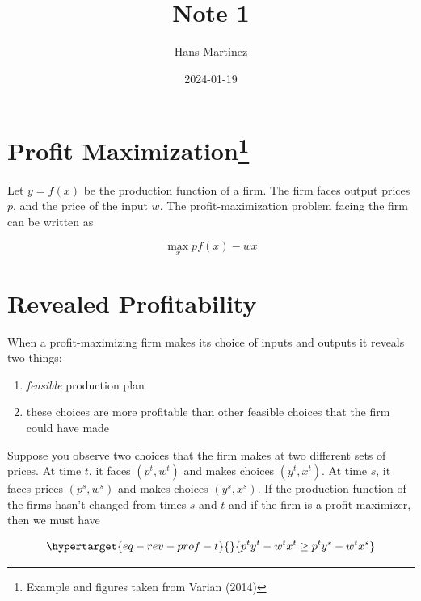 \documentclass[
]{article}
\title{Note 1}
\author{Hans Martinez}
\date{2024-01-19}
\providecommand{\tightlist}{%
  \setlength{\itemsep}{0pt}\setlength{\parskip}{0pt}}\usepackage{longtable,booktabs,array}
\begin{document}
\maketitle
\ifdefined\Shaded\renewenvironment{Shaded}{\begin{tcolorbox}[sharp corners, boxrule=0pt, borderline west={3pt}{0pt}{shadecolor}, enhanced, interior hidden, frame hidden, breakable]}{\end{tcolorbox}}\fi

\hypertarget{profit-maximizationsource}{%
\section[Profit Maximization]{\texorpdfstring{Profit
Maximization\footnote{Example and figures taken from Varian (2014)}}{Profit Maximization}}\label{profit-maximizationsource}}

Let \(y=f(x)\) be the production function of a firm. The firm faces
output prices \(p\), and the price of the input \(w\). The
profit-maximization problem facing the firm can be written as

\[
\max_x pf(x)-wx
\]

\hypertarget{revealed-profitability}{%
\section{Revealed Profitability}\label{revealed-profitability}}

When a profit-maximizing firm makes its choice of inputs and outputs it
reveals two things:

\begin{enumerate}
\def\labelenumi{\arabic{enumi}.}
\tightlist
\item
  \emph{feasible} production plan
\item
  these choices are more profitable than other feasible choices that the
  firm could have made
\end{enumerate}

Suppose you observe two choices that the firm makes at two different
sets of prices. At time \(t\), it faces \((p^t,w^t)\) and makes choices
\((y^t,x^t)\). At time \(s\), it faces prices \((p^s,w^s)\) and makes
choices \((y^s,x^s)\). If the production function of the firms hasn't
changed from times \(s\) and \(t\) and if the firm is a profit
maximizer, then we must have

\begin{equation}\protect\hypertarget{eq-rev-prof-t}{}{
p^ty^t-w^tx^t\ge p^ty^s-w^tx^s
}\label{eq-rev-prof-t}\end{equation}
\end{document}

